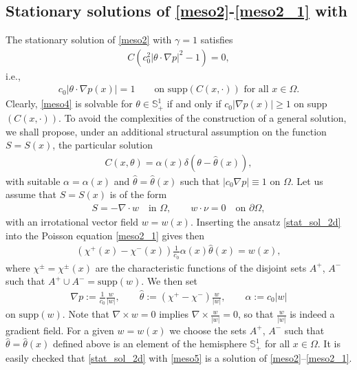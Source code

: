 \documentclass{article}
\numberwithin{equation}{section}
\def\[{\begin{eqnarray*}}
\def\]{\end{eqnarray*}}
\begin{document}
\subsection{Stationary solutions of \eqref{meso2}-\eqref{meso2_1} with }\label{ss2}
The stationary solution of \eqref{meso2} with $\gamma=1$ satisfies
\begin{align}\label{meso3}
    C(c_0^2|\theta\cdot \nabla p|^2 -1) = 0,
\end{align}
i.e.,
\begin{align}\label{meso4}
   c_0|\theta\cdot \nabla p(x)| =1\qquad \mbox{on supp}(C(x,\cdot)) \mbox{ for all } x\in\Omega.
\end{align}
Clearly, \eqref{meso4} is solvable for $\theta\in\mathbb{S}^1_+$ if and only if $c_0 |\nabla p(x)|\geq 1$ on supp$(C(x,\cdot))$.
To avoid the complexities of the construction of a general solution, we shall propose, under an additional structural assumption on the function $S=S(x)$,
the particular solution
\begin{align}\label{stat_sol_2d}
   C(x,\theta) = \alpha(x)\delta\left(\theta - {\hat{\theta}}(x)\right),
\end{align}
with suitable $\alpha=\alpha(x)$ and $\hat{\theta} = \hat{\theta}(x)$ such that
$|c_0\nabla p| \equiv 1$ on $\Omega$.
Let us assume that $S=S(x)$ is of the form
\[
   S = - \nabla\cdot w\quad\mbox{in }\Omega,\qquad w\cdot\nu = 0\quad\mbox{on }\partial\Omega,
\]
with an irrotational vector field $w=w(x)$.
Inserting the ansatz \eqref{stat_sol_2d} into the Poisson equation \eqref{meso2_1} gives then
\begin{align}  \label{CrazyPoisson}
    \left(\chi^+(x) - \chi^-(x)\right) \frac{1}{c_0} \alpha(x) \hat{\theta}(x) = w(x),
\end{align}
where $\chi^\pm = \chi^\pm(x)$ are the characteristic functions of the disjoint sets $A^+$, $A^-$
such that $A^+ \cup A^- = \mbox{supp}(w)$.
We then set
\begin{align}  \label{meso5}
   \nabla p:= \frac{1}{c_0} \frac{w}{|w|},\qquad
   \hat\theta := \left(\chi^+ - \chi^-\right) \frac{w}{|w|},\qquad
   \alpha := c_0 |w|
\end{align}
on $\mbox{supp}(w)$. Note that $\nabla\times w = 0$ implies $\nabla\times\frac{w}{|w|} = 0$,
so that $\frac{w}{|w|}$ is indeed a gradient field.
For a given $w=w(x)$ we choose the sets $A^+$, $A^-$
such that $\hat\theta=\hat\theta(x)$ defined above is an element of the hemisphere $\mathbb{S}^1_+$ for all $x\in\Omega$.
It is easily checked that \eqref{stat_sol_2d} with \eqref{meso5} is a solution of \eqref{meso2}--\eqref{meso2_1}.
\end{document}
